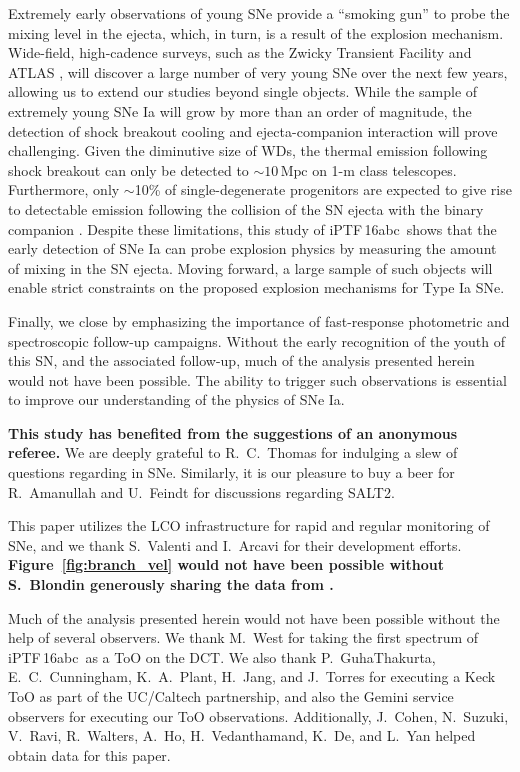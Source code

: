 \documentclass[twocolumn]{aastex61}
\newcommand{\abc}{iPTF\,16abc}
\begin{document}
Extremely early observations of young SNe provide a ``smoking
gun'' to probe the mixing level in the ejecta, which, in turn, is 
a result of the explosion mechanism. Wide-field, high-cadence surveys, such as the Zwicky Transient Facility \citep{2016PASP..128h4501B} and ATLAS \citep{2011PASP..123...58T,2013RSPTA.37120269T}, will discover a large number of very young SNe over the next few years, allowing us to extend our studies beyond single objects. While the sample of extremely young SNe Ia will grow by more than an order of magnitude, the detection of shock breakout cooling and ejecta-companion interaction will prove challenging. Given the diminutive size of WDs, the thermal emission following shock breakout can only be detected to $\sim 10\,\mathrm{Mpc}$ on 1-m class telescopes. Furthermore, only $\sim$10\% of single-degenerate progenitors are expected to give rise to detectable emission following the collision of the SN ejecta with the binary companion \citep{2010ApJ...708.1025K}. Despite these limitations, this study of \abc\ shows that the early detection of SNe Ia can probe explosion physics by measuring the amount of mixing in the SN ejecta. Moving forward, a large sample of such objects will enable strict constraints on the proposed explosion mechanisms for Type Ia SNe.

Finally, we close by emphasizing the importance of fast-response photometric and spectroscopic follow-up campaigns. Without the early recognition of the youth of this SN, and the associated follow-up, much of the analysis presented herein would not have been possible. The ability to trigger such observations is essential to improve our understanding of the physics of SNe Ia.

\acknowledgements

\textbf{This study has benefited from the suggestions of an anonymous
referee.} We are deeply grateful to R.~C.~Thomas for indulging a slew of
questions regarding  in SNe. Similarly, it is our pleasure to buy a
beer for R.~Amanullah and U.~Feindt for discussions regarding SALT2.

This paper utilizes the LCO infrastructure for rapid and regular monitoring of SNe, and we thank S.~Valenti and I.~Arcavi for their development efforts. \textbf{Figure~\ref{fig:branch_vel} would not have been possible without S.~Blondin generously sharing the data from \citet{2012AJ....143..126B}.}

Much of the analysis presented herein would not have been possible without the help of several observers. We thank M.~West for taking the first spectrum of \abc\ as a ToO on the DCT. We also thank P.~GuhaThakurta, E.~C.~Cunningham, K.~A.~Plant, H.~Jang, and J.~Torres for executing a Keck ToO as part of the UC/Caltech partnership, and also the Gemini service observers for executing our ToO observations. Additionally, J.~Cohen, N.~Suzuki, V.~Ravi, R.~Walters, A.~Ho, H.~Vedanthamand, K.~De, and L.~Yan helped obtain data for this paper.
\end{document}

